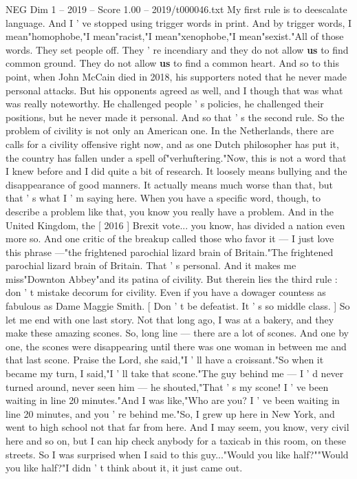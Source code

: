 \begin{textsample}{NEG Dim 1 – 2019 – Score 1.00 – 2019/t000046.txt}
My first rule is to deescalate language.
And I ' ve stopped using trigger words in print.
And by trigger words, I mean"homophobe,"I mean"racist,"I mean"xenophobe,"I mean"sexist."All of those words.
They set people off.
They ' re incendiary and they do not allow \textbf{us} to find common ground.
They do not allow \textbf{us} to find a common heart.
And so to this point, when John McCain died in 2018, his supporters noted that he never made personal attacks.
But his opponents agreed as well, and I though that was what was really noteworthy.
He challenged people ' s policies, he challenged their positions, but he never made it personal.
And so that ' s the second rule.
So the problem of civility is not only an American one.
In the Netherlands, there are calls for a civility offensive right now, and as one Dutch philosopher has put it, the country has fallen under a spell of"verhuftering."Now, this is not a word that I knew before and I did quite a bit of research.
It loosely means bullying and the disappearance of good manners.
It actually means much worse than that, but that ' s what I ' m saying here.
When you have a specific word, though, to describe a problem like that, you know you really have a problem.
And in the United Kingdom, the [ 2016 ] Brexit vote... you know, has divided a nation even more so.
And one critic of the breakup called those who favor it — I just love this phrase —"the frightened parochial lizard brain of Britain."The frightened parochial lizard brain of Britain.
That ' s personal.
And it makes me miss"Downton Abbey"and its patina of civility.
But therein lies the third rule : don ' t mistake decorum for civility.
Even if you have a dowager countess as fabulous as Dame Maggie Smith. [ Don ' t be defeatist.
It ' s so middle class. ] So let me end with one last story.
Not that long ago, I was at a bakery, and they make these amazing scones.
So, long line — there are a lot of scones.
And one by one, the scones were disappearing until there was one woman in between me and that last scone.
Praise the Lord, she said,"I ' ll have a croissant."So when it became my turn, I said,"I ' ll take that scone."The guy behind me — I ' d never turned around, never seen him — he shouted,"That ' s my scone!
I ' ve been waiting in line 20 minutes."And I was like,"Who are you?
I ' ve been waiting in line 20 minutes, and you ' re behind me."So, I grew up here in New York, and went to high school not that far from here.
And I may seem, you know, very civil here and so on, but I can hip check anybody for a taxicab in this room, on these streets.
So I was surprised when I said to this guy..."Would you like half?""Would you like half?"I didn ' t think about it, it just came out.

\end{textsample}
